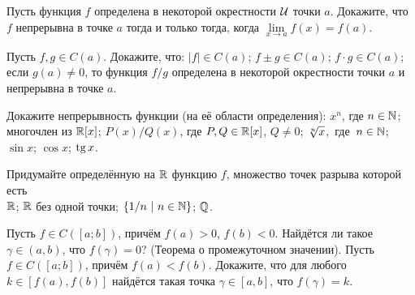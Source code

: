 \documentclass[a4paper,12pt]{article}
\begin{document}


%

Пусть функция $f$ определена в некоторой окрестности $\cal U$ точки $a$. Докажите, что $f$ непрерывна в точке $a$ тогда и только тогда, когда
$\lim\limits_{x \to a} f(x)=f(a)$.




 Пусть $f, g\in C(a)$. Докажите, что:
 $|f|\in C(a)$;
 $f\pm g\in C(a)$;%
 $f\cdot g\in C(a)$; %
 если %
$g(a) \neq 0$,
то функция $f/g$ определена в некоторой
окрестности точки $a$ и непрерывна в точке $a$.

 Докажите непрерывность функции (на е\"е области
определения):
 $x^n$, где $n\in\mathbb{N}$;
 \hskip-1pt многочлен из $\mathbb{R}[x]$; \hskip-1pt
 \hskip-1pt $P(x)/Q(x)$, где $P,Q\in\mathbb{R}[x]$, $Q\ne0$;\hskip-1pt
 \hskip-1pt $\root n \of x$,~где~$n\in\mathbb{N}$;\hskip-1pt
 \hskip-1pt $\sin x$;\hskip-1pt
 \hskip-1pt $\cos x$;\hskip-1pt
 \hskip-1pt $\tg x$.

 Придумайте определ\"енную на $\mathbb{R}$ функцию $f$, множество точек разрыва которой есть\\
 $\mathbb{R}$;
 $\mathbb{R}$ без одной точки;
 $\{1/n\ | \ n\in\mathbb{N}\}$;
 $\mathbb{Q}$.





Пусть $f\in C([a;b])$, прич\"ем
$f(a) > 0$, $f(b) <0$. Найд\"ется ли такое $\gamma\in (a,b)$, что
$f(\gamma)=0$?
{\small\sc (Теорема о промежуточном значении).}
Пусть $f\in C([a;b])$, прич\"ем  $f(a) < f(b)$.
Докажите, что для любого $k \in [f(a), f(b)]$  найд\"ется такая
точка $\gamma\in [a,b]$, что $f(\gamma) = k$.
\end{document}
